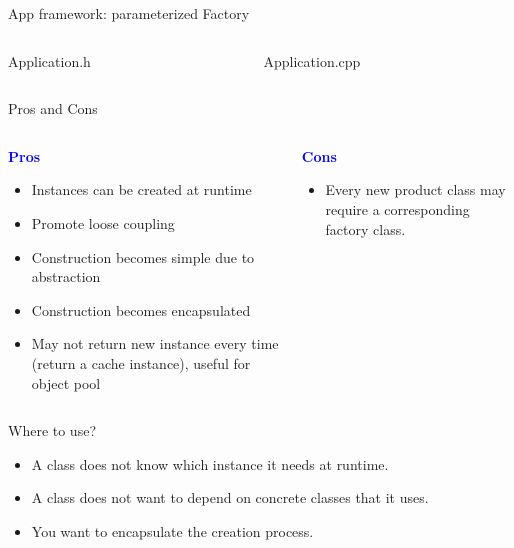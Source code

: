 \documentclass[13pt]{beamer}
\begin{document}
\begin{frame}{App framework: parameterized Factory}
\begin{columns}[T]
\begin{column}{.45\textwidth}
\lstset{basicstyle=\tiny,style=myCustomCppStyle}
Application.h

\end{column}

\begin{column}{.45\textwidth}
\lstset{basicstyle=\tiny,style=myCustomCppStyle}
Application.cpp

\end{column}
\end{columns}
\end{frame}

\begin{frame}{Pros and Cons}
\begin{columns}[T]
\begin{column}{.45\textwidth}
	\begin{center}
	\textcolor{blue}{\textbf{Pros}}
	\end{center}
	\begin{itemize}
		\item Instances can be created at runtime
		\item Promote loose coupling
		\item Construction becomes simple due to abstraction
		\item Construction becomes encapsulated
		\item May not return new instance every time (return a cache instance), useful for object pool
	\end{itemize}
\end{column}
\begin{column}{.45\textwidth}
	\begin{center}
	\textcolor{blue}{\textbf{Cons}}
	\end{center}
		\begin{itemize}
		\setlength\itemsep{1em}
		\item Every new product class may require a corresponding factory class.
	\end{itemize}
\end{column}
\end{columns}
\end{frame}

\begin{frame}{Where to use?}	
	\begin{itemize}
		\setlength\itemsep{1em}
		\item A class does not know which instance it needs at runtime.
		\item A class does not want to depend on concrete classes that it uses.
		\item You want to encapsulate the creation process.
	\end{itemize}
\end{frame}
\end{document}
